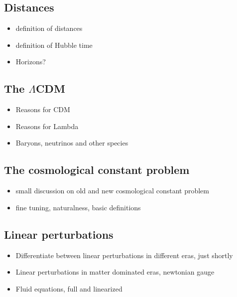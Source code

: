 \subsection{Distances}
\begin{itemize}
\item definition of distances
\item definition of Hubble time 
\item Horizons?
\end{itemize}


\subsection{The $\Lambda$CDM }

\begin{itemize}
\item Reasons for CDM
\item Reasons for Lambda
\item Baryons, neutrinos and other species
\end{itemize}

\subsection{The cosmological constant problem}

\begin{itemize}
\item small discussion on old and new cosmological constant problem
\item fine tuning, naturalness, basic definitions
\end{itemize}

\subsection{Linear perturbations}

\begin{itemize}
\item Differentiate between linear perturbations in different eras, just shortly
\item Linear perturbations in matter dominated eras, newtonian gauge
\item Fluid equations, full and linearized
\end{itemize}




